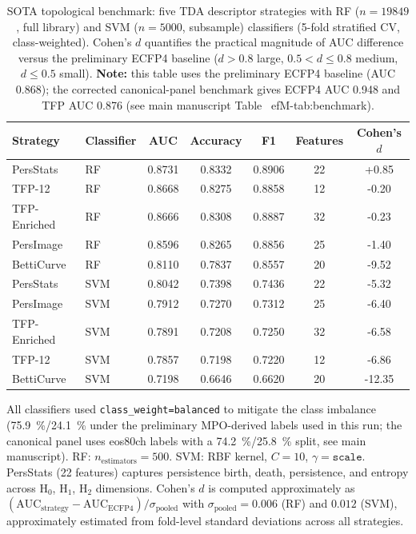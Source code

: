 \documentclass[11pt,a4paper]{article}
\begin{document}
\begin{table}[htbp]
\centering
\caption{SOTA topological benchmark: five TDA descriptor strategies with RF ($n = \num{19849}$, full library) and SVM ($n = \num{5000}$, subsample) classifiers (5-fold stratified CV, class-weighted). Cohen's $d$ quantifies the practical magnitude of AUC difference versus the preliminary ECFP4 baseline ($d > 0.8$ large, $0.5 < d \leq 0.8$ medium, $d \leq 0.5$ small). \textbf{Note:} this table uses the preliminary ECFP4 baseline (AUC \num{0.868}); the corrected canonical-panel benchmark gives ECFP4 AUC \num{0.948} and TFP AUC \num{0.876} (see main manuscript Table~
ef{M-tab:benchmark}).}
\label{SM-tab:sota}
\begin{tabularx}{\textwidth}{l l S[table-format=1.4] S[table-format=1.4] S[table-format=1.4] S[table-format=1.0] S[table-format=+1.2]}
\toprule
{Strategy} & {Classifier} & {AUC} & {Accuracy} & {F1} & {Features} & {Cohen's $d$} \\
\midrule
PersStats & RF & 0.8731 & 0.8332 & 0.8906 & 22 & +0.85 \\
TFP-12 & RF & 0.8668 & 0.8275 & 0.8858 & 12 & -0.20 \\
TFP-Enriched & RF & 0.8666 & 0.8308 & 0.8887 & 32 & -0.23 \\
PersImage & RF & 0.8596 & 0.8265 & 0.8856 & 25 & -1.40 \\
BettiCurve & RF & 0.8110 & 0.7837 & 0.8557 & 20 & -9.52 \\
PersStats & SVM & 0.8042 & 0.7398 & 0.7436 & 22 & -5.32 \\
PersImage & SVM & 0.7912 & 0.7270 & 0.7312 & 25 & -6.40 \\
TFP-Enriched & SVM & 0.7891 & 0.7208 & 0.7250 & 32 & -6.58 \\
TFP-12 & SVM & 0.7857 & 0.7198 & 0.7220 & 12 & -6.86 \\
BettiCurve & SVM & 0.7198 & 0.6646 & 0.6620 & 20 & -12.35 \\
\bottomrule
\end{tabularx}
\vspace{1mm}
\footnotesize All classifiers used \texttt{class\_weight=balanced} to mitigate the class imbalance (\qty{75.9}{\percent}/\qty{24.1}{\percent} under the preliminary MPO-derived labels used in this run; the canonical panel uses eos80ch labels with a \qty{74.2}{\percent}/\qty{25.8}{\percent} split, see main manuscript). RF: $n_{\text{estimators}} = 500$. SVM: RBF kernel, $C = 10$, $\gamma = \texttt{scale}$. PersStats (22 features) captures persistence birth, death, persistence, and entropy across H$_0$, H$_1$, H$_2$ dimensions. Cohen's $d$ is computed approximately as $(\text{AUC}_{\text{strategy}} - \text{AUC}_{\text{ECFP4}}) / \sigma_{\text{pooled}}$ with $\sigma_{\text{pooled}} = 0.006$ (RF) and $0.012$ (SVM), approximately estimated from fold-level standard deviations across all strategies.
\end{table}
\end{document}
